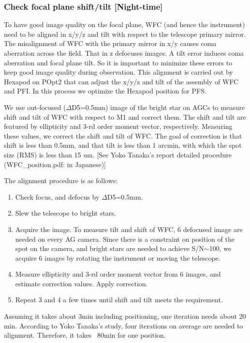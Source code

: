 \subsubsection{Check focal plane shift/tilt [Night-time]}\label{secflow:WFCTiltShift}

To have good image quality on the focal plane, WFC (and hence the instrument) need to be aligned in x/y/z and tilt with respect to the telescope primary mirror.
The misalignment of WFC with the primary mirror in x/y causes coma aberration across the field.
That in z defocuses images.
A tilt error induces coma aberration and focal plane tilt.
So it is important to minimize these errors to keep good image quality during observation. 
This alignment is carried out by Hexapod on POpt2 that can adjust the x/y/z and tilt of the assembly of WFC and PFI.
In this process we optimize the Hexapod position for PFS.

We use out-focused ($\Delta$D5=0.5mm) image of the bright star on AGCs to measure shift and tilt of WFC with respect to M1 and correct them.
The shift and tilt are featured by ellipticity and 3-rd order moment vector, respectively.
Measuring these values, we correct the shift and tilt of WFC.
The goal of correction is that shift is less than 0.5mm, and that tilt is less than 1 arcmin, with which the spot size (RMS) is less than 15 um.
[See Yoko Tanaka's report detailed procedure (WFC\_position.pdf: in Japanese)]

The alignment procedure is as follows:
\begin{enumerate}
\item Check focus, and defocus by $\Delta$D5=0.5mm.
\item Slew the telescope to bright stars.
\item Acquire the image.
To measure tilt and shift of WFC, 6 defocused image are needed on every AG camera.
Since there is a constraint on position of the spot on the camera, and bright stars are needed to achieve S/N$\sim$100, we acquire 6 images by rotating the instrument or moving the telescope.
\item Measure ellipticity and 3-rd order moment vector from 6 images, and estimate correction values.
Apply correction.
\item Repeat 3 and 4 a few times until shift and tilt meets the requirement.
\end{enumerate}

Assuming it takes about 3min including positioning, one iteration needs about 20 min.
According to Yoko Tanaka's study, four iterations on average are needed to alignment.
Therefore, it takes ~80min for one position.

